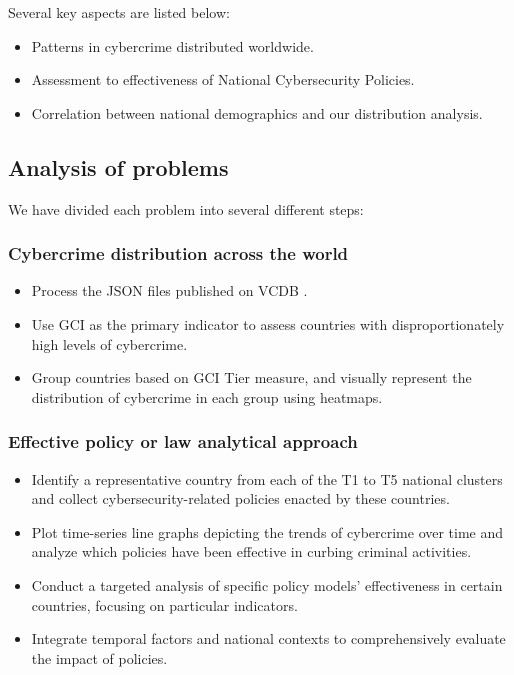	Several key aspects are listed below:
	\begin{itemize}
		\item Patterns in cybercrime distributed worldwide.
		\item Assessment to effectiveness of National Cybersecurity Policies.
		\item Correlation between national demographics and our distribution analysis.
	\end{itemize}
\subsection{Analysis of problems}\label{subsec:analysis-of-problems} %
	We have divided each problem into several different steps:
	\subsubsection[]{Cybercrime distribution across the world} %
		\begin{itemize}
			\item Process the JSON files published on VCDB .
			\item Use GCI as the primary indicator to assess countries with disproportionately high levels of cybercrime.
			\item Group countries based on GCI Tier measure, and
				visually represent the distribution of cybercrime in each group using heatmaps.
		\end{itemize}
	\subsubsection[]{Effective policy or law analytical approach} %
		\begin{itemize}
			\item Identify a representative country from each of the T1 to T5 national clusters and
				collect cybersecurity-related policies enacted by these countries.
			\item Plot time-series line graphs depicting the trends of cybercrime over time and
				analyze which policies have been effective in curbing criminal activities.
			\item Conduct a targeted analysis of specific policy models' effectiveness in certain countries,
				focusing on particular indicators.
			\item Integrate temporal factors and national contexts to comprehensively evaluate the impact of policies.
		\end{itemize}
